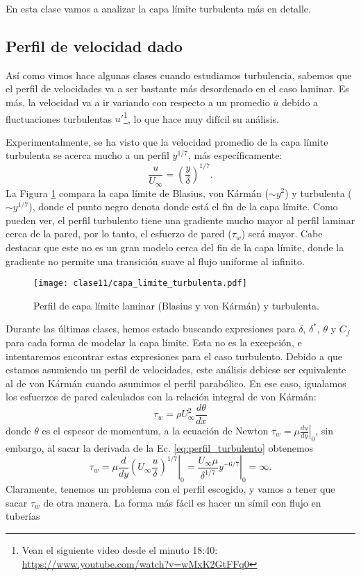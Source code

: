 En esta clase vamos a analizar la capa límite turbulenta más en detalle.

\subsection*{Perfil de velocidad dado}

Así como vimos hace algunas clases cuando estudiamos turbulencia, sabemos que el perfil de velocidades va a ser bastante más desordenado en el caso laminar.
Es más, la velocidad va a ir variando con respecto a un promedio $\overline{u}$ debido a fluctuaciones turbulentas $u'$\footnote{Vean el siguiente video desde el minuto 18:40: \url{https://www.youtube.com/watch?v=wMxK2GtFFq0}}, lo que hace muy difícil su análisis.

Experimentalmente, se ha visto que la velocidad promedio de la capa límite turbulenta se acerca mucho a un perfil $y^{1/7}$, más específicamente:
%
\begin{equation}\label{eq:perfil_turbulento}
\frac{u}{U_\infty} = \left(\frac{y}{\delta}\right)^{1/7}.
\end{equation}
%
La Figura \ref{fig:capa_limite_turbulenta} compara la capa límite de Blasius, von Kármán ($\sim y^2$) y turbulenta ($\sim y^{1/7}$), donde el punto negro denota donde está el fin de la capa límite. Como pueden ver, el perfil turbulento tiene una gradiente mucho mayor al perfil laminar cerca de la pared, por lo tanto, el esfuerzo de pared ($\tau_w$) será mayor.
Cabe destacar que este no es un gran modelo cerca del fin de la capa límite, donde la gradiente no permite una transición suave al flujo uniforme al infinito.
%
\begin{figure}
\centering
\texttt{[image: clase11/capa\_limite\_turbulenta.pdf]}
\caption{Perfil de capa límite laminar (Blasius y von Kármán) y turbulenta.}
\label{fig:capa_limite_turbulenta}
\end{figure}

Durante las últimas clases, hemos estado buscando expresiones para $\delta$, $\delta^*$, $\theta$ y $C_f$ para cada forma de modelar la capa límite. 
Esta no es la excepción, e intentaremos encontrar estas expresiones para el caso turbulento.
Debido a que estamos asumiendo un perfil de velocidades, este análisis debiese ser equivalente al de von Kármán cuando asumimos el perfil parabólico.
En ese caso, igualamos los esfuerzos de pared calculados con la relación integral de von Kármán:
%
\begin{equation}
\tau_w = \rho U_\infty^2 \frac{d\theta}{dx}
\end{equation}
%
donde $\theta$ es el espesor de momentum, a la ecuación de Newton $\tau_w = \left.\mu\frac{du}{dy}\right|_0$, sin embargo, al sacar la derivada de la Ec. \eqref{eq:perfil_turbulento} obtenemos
%
\begin{equation}
\tau_w = \left.\mu \frac{d}{dy}\left(U_\infty\frac{u}{\delta}\right)^{1/7}\right|_0 = \left.\frac{U_\infty\mu}{\delta^{1/7}}y^{-6/7}\right|_0 = \infty.
\end{equation}
%
Claramente, tenemos un problema con el perfil escogido, y vamos a tener que sacar $\tau_w$ de otra manera.
La forma más fácil es hacer un símil con flujo en tuberías
